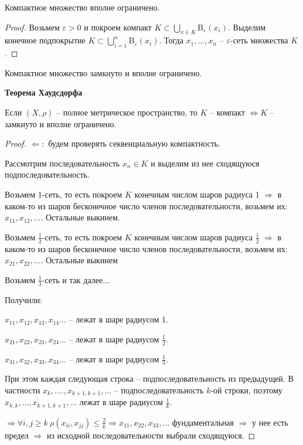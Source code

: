 \begin{theorem}
    Компактное множество вполне ограничено.
\end{theorem}

\begin{proof}
    Возьмем $\varepsilon>0$ и покроем компакт $K\subset \bigcup\limits_{x\in K}$B$_\varepsilon(x_i)$. Выделим конечное подпокрытие $K\subset \bigcup\limits_{i=1}^n$B$_\varepsilon(x_i)$. Тогда $x_1, ..., x_n$ – $\varepsilon$-сеть множества $K$.
\end{proof}

\begin{corollary}
    Компактное множество замкнуто и вполне ограничено.
\end{corollary}

\begin{theorem}
    \textbf{Теорема Хаудсдорфа}

    Если $(X, \rho)$ – полное метрическое пространство, то $K$ – компакт $\Leftrightarrow K$ – замкнуто и вполне ограничено.
\end{theorem}

\begin{proof}
    $\Leftarrow:$ будем проверять секвенциальную компактность.

    Рассмотрим последовательность $x_n\in K$ и выделим из нее сходящуюся подпоследовательность.

    Возьмем 1-сеть, то есть покроем $K$ конечным числом шаров радиуса 1 $\Rightarrow$ в каком-то из шаров бесконечное число членов последовательности, возьмем их: $x_{11}, x_{12}, ...$. Остальные выкинем.

    Возьмем $\frac{1}{2}$-сеть, то есть покроем $K$ конечным числом шаров радиуса $\frac{1}{2}$ $\Rightarrow$ в каком-то из шаров бесконечное число членов последовательности, возьмем их: $x_{21}, x_{22}, ...$. Остальные выкинем
    
    Возьмем $\frac{1}{3}$-сеть и так далее...

    Получили:
    
    $x_{11}, x_{12}, x_{13}, x_{14} ...$ – лежат в шаре радиусом 1.

    $x_{21}, x_{22}, x_{23}, x_{24} ...$ – лежат в шаре радиусом $\frac{1}{2}$.

    $x_{31}, x_{32}, x_{33}, x_{34} ...$ – лежат в шаре радиусом $\frac{1}{3}$.

    При этом каждая следующая строка – подпоследовательность из предыдущей. В частности $x_k, . ...,  x_{k+1, k+1},...$ –  подпоследовательность $k$-ой строки, поэтому $x_{k,k}, ...,  x_{k+1, k+1},...$ лежат в шаре радиусом $\frac{1}{k}$.

    $\Rightarrow\forall i, j\geq k\ \rho(x_{ii}, x_{jj})\leq \frac{2}{k}\Rightarrow x_{11}, x_{22}, x_{33}, ...$ фундаментальная $\Rightarrow$ у нее есть предел $\Rightarrow$ из исходной последовательности выбрали сходящуюся.
\end{proof}


